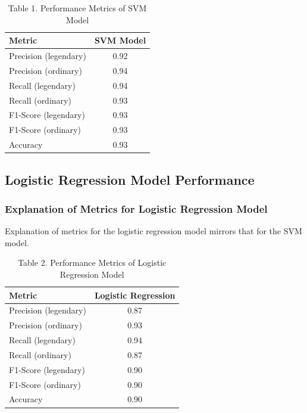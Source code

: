 \documentclass[conference]{IEEEtran}
\begin{document}
\begin{table}[H]
    \centering
    \begin{tabular}{|l|c|}
    \hline
    \textbf{Metric} & \textbf{SVM Model} \\ \hline
    Precision (legendary) & 0.92               \\ \hline
    Precision (ordinary)  & 0.94               \\ \hline
    Recall (legendary)    & 0.94               \\ \hline
    Recall (ordinary)     & 0.93               \\ \hline
    F1-Score (legendary)  & 0.93               \\ \hline
    F1-Score (ordinary)   & 0.93               \\ \hline
    Accuracy              & 0.93               \\ \hline
    \end{tabular}
    \caption{Table 1. Performance Metrics of SVM Model}
    \label{tab:svm_performance}
\end{table}

\subsection{Logistic Regression Model Performance}
\label{sec:lr_performance}
\subsubsection{Explanation of Metrics for Logistic Regression Model}
Explanation of metrics for the logistic regression model mirrors that for the SVM model.

\begin{table}[H]
    \centering
    \begin{tabular}{|l|c|}
    \hline
    \textbf{Metric} & \textbf{Logistic Regression} \\ \hline
    Precision (legendary) & 0.87               \\ \hline
    Precision (ordinary)  & 0.93               \\ \hline
    Recall (legendary)    & 0.94               \\ \hline
    Recall (ordinary)     & 0.87               \\ \hline
    F1-Score (legendary)  & 0.90               \\ \hline
    F1-Score (ordinary)   & 0.90               \\ \hline
    Accuracy              & 0.90               \\ \hline
    \end{tabular}
    \caption{Table 2. Performance Metrics of Logistic Regression Model}
    
\end{table}
\end{document}
